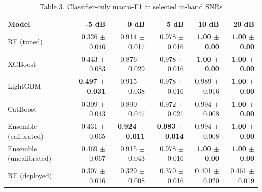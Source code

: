 \begin{table}[htbp]
\centering
\small
\caption{Table 3. Classifier-only macro-F1 at selected in-band SNRs}
\label{tab:table3_f1_at_snr}
\begin{tabular}{lrrrrr}
\toprule
Model & -5 dB & 0 dB & 5 dB & 10 dB & 20 dB \\
\midrule
RF (tuned) & 0.326 $\pm$ 0.046 & 0.914 $\pm$ 0.017 & 0.978 $\pm$ 0.016 & \textbf{1.00 $\pm$ 0.00} & \textbf{1.00 $\pm$ 0.00} \\
XGBoost & 0.443 $\pm$ 0.083 & 0.876 $\pm$ 0.029 & 0.978 $\pm$ 0.016 & \textbf{1.00 $\pm$ 0.00} & \textbf{1.00 $\pm$ 0.00} \\
LightGBM & \textbf{0.497 $\pm$ 0.031} & 0.915 $\pm$ 0.038 & 0.978 $\pm$ 0.016 & 0.989 $\pm$ 0.016 & \textbf{1.00 $\pm$ 0.00} \\
CatBoost & 0.309 $\pm$ 0.043 & 0.890 $\pm$ 0.047 & 0.972 $\pm$ 0.021 & 0.994 $\pm$ 0.008 & \textbf{1.00 $\pm$ 0.00} \\
Ensemble (calibrated) & 0.431 $\pm$ 0.065 & \textbf{0.924 $\pm$ 0.011} & \textbf{0.983 $\pm$ 0.014} & 0.994 $\pm$ 0.008 & \textbf{1.00 $\pm$ 0.00} \\
Ensemble (uncalibrated) & 0.469 $\pm$ 0.067 & 0.915 $\pm$ 0.043 & 0.978 $\pm$ 0.016 & \textbf{1.00 $\pm$ 0.00} & \textbf{1.00 $\pm$ 0.00} \\
RF (deployed) & 0.307 $\pm$ 0.016 & 0.329 $\pm$ 0.008 & 0.370 $\pm$ 0.016 & 0.401 $\pm$ 0.020 & 0.461 $\pm$ 0.019 \\
\bottomrule
\end{tabular}
\end{table}
